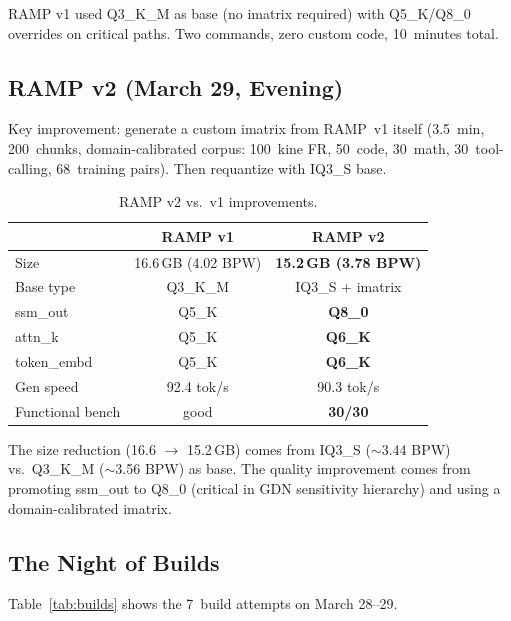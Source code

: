 \documentclass[10pt,a4paper]{article}
\begin{document}
RAMP v1 used Q3\_K\_M as base (no imatrix required) with Q5\_K/Q8\_0 overrides on critical paths. Two commands, zero custom code, 10~minutes total.

\subsection{RAMP v2 (March 29, Evening)}

Key improvement: generate a custom imatrix from RAMP~v1 itself (3.5~min, 200~chunks, domain-calibrated corpus: 100~kine FR, 50~code, 30~math, 30~tool-calling, 68~training pairs). Then requantize with IQ3\_S base.

\begin{table}[h]
\centering
\caption{RAMP v2 vs.\ v1 improvements.}
\begin{tabular}{lcc}
\toprule
& \textbf{RAMP v1} & \textbf{RAMP v2} \\
\midrule
Size & 16.6\,GB (4.02 BPW) & \textbf{15.2\,GB (3.78 BPW)} \\
Base type & Q3\_K\_M & IQ3\_S + imatrix \\
ssm\_out & Q5\_K & \textbf{Q8\_0} \\
attn\_k & Q5\_K & \textbf{Q6\_K} \\
token\_embd & Q5\_K & \textbf{Q6\_K} \\
Gen speed & 92.4 tok/s & 90.3 tok/s \\
Functional bench & good & \textbf{30/30} \\
\bottomrule
\end{tabular}
\end{table}

The size reduction (16.6 $\to$ 15.2\,GB) comes from IQ3\_S ($\sim$3.44 BPW) vs.\ Q3\_K\_M ($\sim$3.56 BPW) as base. The quality improvement comes from promoting ssm\_out to Q8\_0 (critical in GDN sensitivity hierarchy) and using a domain-calibrated imatrix.

\subsection{The Night of Builds}

Table~\ref{tab:builds} shows the 7~build attempts on March 28--29.
\end{document}
